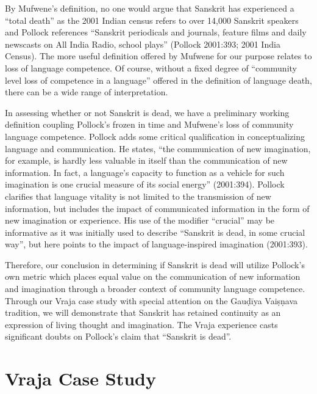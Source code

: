 By Mufwene’s definition, no one would argue that Sanskrit has experienced a “total death” as the 2001 Indian census refers to over 14,000 Sanskrit speakers and Pollock references “Sanskrit periodicals and journals, feature films and daily newscasts on All India Radio, school plays” (Pollock 2001:393; 2001 India Census). The more useful definition offered by Mufwene for our purpose relates to loss of language competence. Of course, without a fixed degree of “community level loss of competence in a language” offered in the definition of language death, there can be a wide range of interpretation. 

In assessing whether or not Sanskrit is dead, we have a preliminary working definition coupling Pollock’s frozen in time and Mufwene’s loss of community language competence. Pollock adds some critical qualification in conceptualizing language and communication. He states, “the communication of new imagination, for example, is hardly less valuable in itself than the communication of new information. In fact, a language’s capacity to function as a vehicle for such imagination is one crucial measure of its social energy” (2001:394). Pollock clarifies that language vitality is not limited to the transmission of new information, but includes the impact of communicated information in the form of new imagination or experience. His use of the modifier “crucial” may be informative as it was initially used to describe “Sanskrit is dead, in some crucial way”, but here points to the impact of language-inspired imagination (2001:393). 

Therefore, our conclusion in determining if Sanskrit is dead will utilize Pollock’s own metric which places equal value on the communication of new information and imagination through a broader context of community language competence. Through our Vraja case study with special attention on the Gauḍīya Vaiṣṇava tradition, we will demonstrate that Sanskrit has retained continuity as an expression of living thought and imagination. The Vraja experience casts significant doubts on Pollock’s claim that “Sanskrit is dead”. 

\section*{Vraja Case Study}

